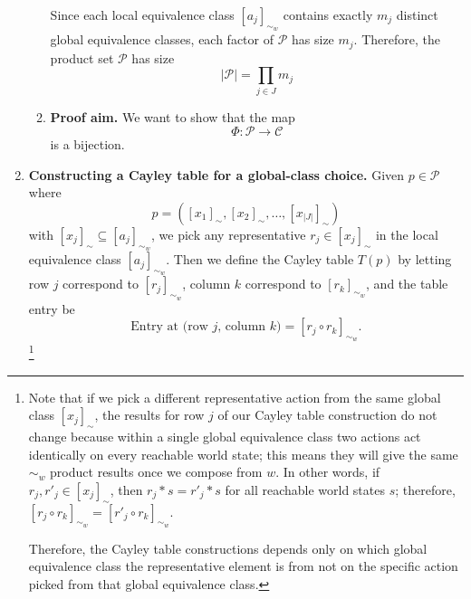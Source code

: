 \begin{proofE}
\begin{enumerate}
\begin{enumerate}
        Since each local equivalence class $[a_{j}]_{\sim_{w}}$ contains exactly $m_{j}$ distinct global equivalence classes, each factor of $\mathcal{P}$ has size $m_{j}$.
        Therefore, the product set $\mathcal{P}$ has size
        \begin{equation}\label{eqn:product_set_size}
            |\mathcal{P}| = \prod_{j \in J} m_{j}
        \end{equation}

        \item \textbf{Proof aim.}
        We want to show that the map
        \begin{equation}
            \Phi: \mathcal{P} \to \mathcal{C}
        \end{equation}
        is a bijection.
    \end{enumerate}

    \item \textbf{Constructing a Cayley table for a global-class choice.}
    Given $p \in \mathcal{P}$ where
    \begin{equation}
        p = ([x_{1}]_{\sim}, [x_{2}]_{\sim}, \dots , [x_{|J|}]_{\sim})
    \end{equation}
    with $[x_{j}]_{\sim} \subseteq [a_{j}]_{\sim_{w}}$, we pick any representative $r_{j} \in [x_{j}]_{\sim}$ in the local equivalence class $[a_{j}]_{\sim_{w}}$.
    Then we define the Cayley table $T(p)$ by letting row $j$ correspond to $[r_{j}]_{\sim_{w}}$, column $k$ correspond to $[r_{k}]_{\sim_{w}}$, and the table entry be
    \begin{equation}
        \text{Entry at (row $j$, column $k$)} = [r_{j} \circ r_{k}]_{\sim_{w}}.
    \end{equation}
    \footnote{
    Note that if we pick a different representative action from the same global class $[x_{j}]_{\sim}$, the results for row $j$ of our Cayley table construction do not change because within a single global equivalence class two actions act identically on every reachable world state; this means they will give the same $\sim_{w}$ product results once we compose from $w$.
    In other words, if $r_{j}, r'_{j} \in [x_{j}]_{\sim}$, then $r_{j} \ast s = r'_{j} \ast s$ for all reachable world states $s$; therefore, $[r_{j} \circ r_{k}]_{\sim_{w}} = [r'_{j} \circ r_{k}]_{\sim_{w}}$.
    
    Therefore, the Cayley table constructions depends only on which global equivalence class the representative element is from not on the specific action picked from that global equivalence class.
    }


\end{enumerate}
\end{proofE}

